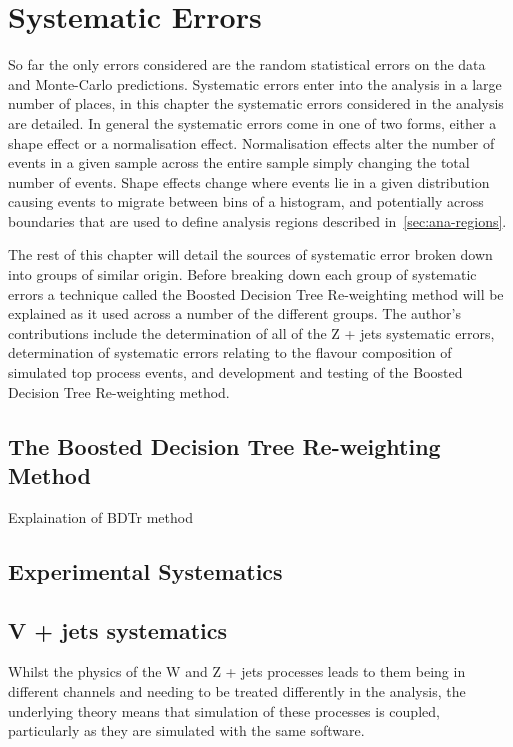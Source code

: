 \chapter{Systematic Errors}%
\label{ch:systematics}

So far the only errors considered are the random statistical errors on the data
and Monte-Carlo predictions. Systematic errors enter into the analysis in a
large number of places, in this chapter the systematic errors considered in the
analysis are detailed. In general the systematic errors come in one of two
forms, either a shape effect or a normalisation effect. Normalisation effects
alter the number of events in a given sample across the entire sample simply
changing the total number of events. Shape effects change where events lie in a
given distribution causing events to migrate between bins of a histogram, and
potentially across boundaries that are used to define analysis regions described
in~\ref{sec:ana-regions}.

The rest of this chapter will detail the sources of systematic error broken down
into groups of similar origin. Before breaking down each group of systematic
errors a technique called the Boosted Decision Tree Re-weighting method will be
explained as it used across a number of the different groups. The author's
contributions include the determination of all of the Z + jets systematic
errors, determination of systematic errors relating to the flavour composition
of simulated top process events, and development and testing of the Boosted
Decision Tree Re-weighting method.

\section{The Boosted Decision Tree Re-weighting Method}
\label{sec:bdtr}
Explaination of BDTr method

\section{Experimental Systematics}


\section{V + jets systematics}
\label{sec:zjets-shapes}
Whilst the physics of the W and Z + jets processes leads to them being in
different channels and needing to be treated differently in the analysis, the
underlying theory means that simulation of these processes is coupled,
particularly as they are simulated with the same software.

